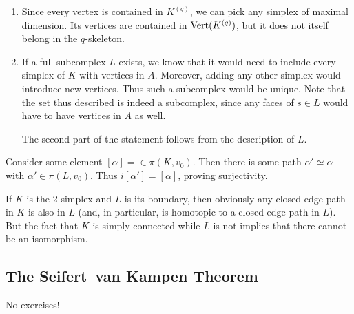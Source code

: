 \documentclass[../../solutions.tex]{subfiles}
\begin{document}
\begin{exercise} \leavevmode
\begin{enumerate}
\item 
Since every vertex is contained in $K^{(q)}$, we can pick any simplex of maximal dimension.
Its vertices are contained in $\operatorname{Vert}(K^{(q)})$, but it does not itself belong in the $q$-skeleton.
\item 
If a full subcomplex $L$ exists, we know that it would need to include every simplex of $K$ with vertices in $A$.
Moreover, adding any other simplex would introduce new vertices.
Thus such a subcomplex would be unique.
Note that the set thus described is indeed a subcomplex, since any faces of $s\in L$ would have to have vertices in $A$ as well.

The second part of the statement follows from the description of $L$.
\end{enumerate}
\end{exercise}

\begin{exercise} \leavevmode
Consider some element $[\alpha]=\in\pi(K,v_0)$.
Then there is some path $\alpha'\simeq\alpha$ with $\alpha'\in\pi(L,v_0)$.
Thus $i[\alpha']=[\alpha]$, proving surjectivity.

If $K$ is the 2-simplex and $L$ is its boundary, then obviously any closed edge path in $K$ is also in $L$ (and, in particular, is homotopic to a closed edge path in $L$).
But the fact that $K$ is simply connected while $L$ is not implies that there cannot be an isomorphism.
\end{exercise}

\subsection{The Seifert--van Kampen Theorem}
No exercises!
\end{document}
